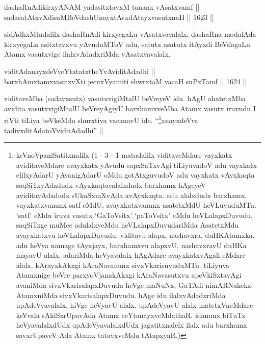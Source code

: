 \begin{shl}
dashaRnAdikirxyANAM yadasitxtavxM tananx vAsatxvamf || \\
sadasatAtxvXdisaMBeVdashUnayxtAvxdAtayxvasutxnaH \hfill || 1623 ||  
\end{shl}

\begin{artha}
sidAdhxMtadalilx dashaRnAdi kirxyegaLu vAsatxvavalalx. dashaRna modalAda kirxyegaLa asitxtavxvu yAvuduMToV adu, satutx asatutx itAyxdi BeVdagaLu Atamx vasutxvige ilalxvAdadxriMda vAsatxvavalalx.
\end{artha}


\begin{shl}
viditAdanayxdeVveYtatatxtheYvAviditAdadhi || \\
barxhAmxtamxvasitxvXti jecnxVyamiti shwrxtaM vacaH suPxTamf \hfill || 1624 ||  
\end{shl}

\begin{artha}
viditaveMba (sadavxsutx) vasutxvigiMtalU beVreyeV idu. hAgU ahatetxMba avidita vasutxvigiMtalU beVreyAgiyU barxhamxveMba Atamx vasutx iruvudu I riVti tiLiya beVkeMdu shurxtiya vacanavU ide. ``\footnote{keVnoVpaniSatitxnalilx (1 - 3 - 1 matadalilx viditaveMdare vayxkatx aviditaveMdare avayxkatx yAvudu sapxSaTxvAgi tiLiyuvadoV adu vayxkatx elilxyAdarU yAvanigAdarU oMdu gotAtxguvudoV adu vayxkatx vAyxkaqta saqSiTxyAdadudx vAyxkaqtavalalxdudx barxhamx hAgeyeV aviditavAdadudx sUkaSxmXvAda avAyxkaqta. adu alalxdudx barxhamx. vayxkatxvanunx satf eMdU, avayxkatxvanunx asatetxMdU heVLuvuduMTu. `satf' eMdu iruva vasutx `GaToV\s sitx' `paToV\s sitx' eMdu heVLalapxDuvudu. saqSiTxge muMce adulalxveMdu heVLalapxDuvudariMda AsatetxMdu avayxkatxvu heVLalapxDuvudu. viditavu alapx, nashavxra, duHKAtamxka. adu heVya namage tAyxjayx, barxhamxvu alapxvU, nashavxravU duHKa mayavU alalx. adariMda heVyavalalx hAgAdare avayxkatxvAgali eMdare alalx. kArayxkAkxgi kAraNavanunx sivxVkarisuvuduMTu. tiLiyuva Atamxnige beVre parxyoVjanakAkxgi kAraNavasutxvu apeVkiSxtavAgi avaniMda sivxVkarisalapxDuvudu heVge maNuNx, GaTAdi nimARNakekx AtamxniMda sivxVkarisalapxDuvudu. hAge idu ilalxvAdadxriMda upAdeVyavalalx. hiVge heVyavU alalx. upAdeVyavU alalx matetxVneMdare keVvala sAkiSxrUpavAda Atamx ceYtanayxveMdathaR. idanunx biTuTx heVyavalalxdUdx upAdeVyavalalxdUdx jagatitxnalelx ilalx adu barxhamx savxrUpaveV Ada Atamx tatavxveMdu tAtapxyaR.)}anayxdeVva tadivxditAdatoV\s viditAdadhi'' ||
\end{artha}

